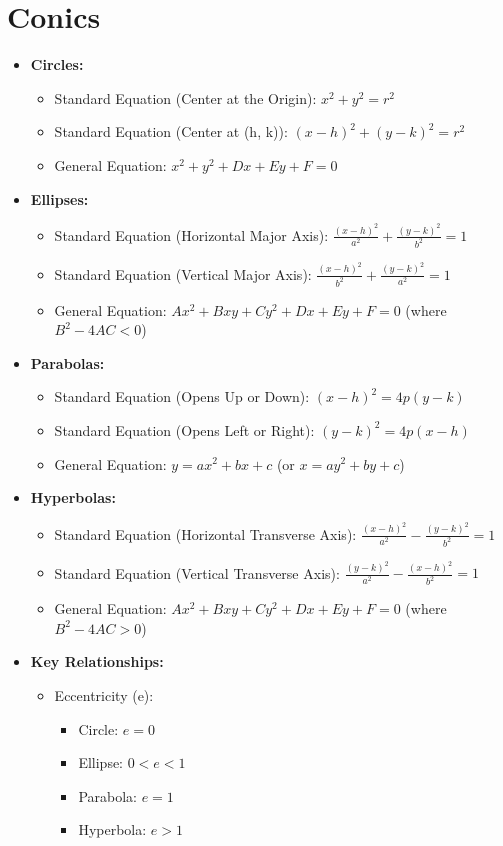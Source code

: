 \documentclass[letterpaper,12pt]{article}
\author{Shawn Ma}
\date{\today}
\begin{document}
\setlength{\parindent}{0pt}
\section{Conics}
\begin{itemize}
    \item \textbf{Circles:}
        \begin{itemize}
        \item Standard Equation (Center at the Origin):  $x^2 + y^2 = r^2$
        \item Standard Equation (Center at (h, k)): $(x - h)^2 + (y - k)^2 = r^2$
        \item General Equation: $x^2 + y^2 + Dx + Ey + F = 0$
        \end{itemize}
    \item \textbf{Ellipses:}
        \begin{itemize}
        \item Standard Equation (Horizontal Major Axis): $\frac{(x - h)^2}{a^2} + \frac{(y - k)^2}{b^2} = 1$
        \item Standard Equation (Vertical Major Axis): $\frac{(x - h)^2}{b^2} + \frac{(y - k)^2}{a^2} = 1$
        \item General Equation: $Ax^2 + Bxy + Cy^2 + Dx + Ey + F = 0$ (where $B^2 - 4AC < 0$)
        \end{itemize}
    \item \textbf{Parabolas:}
        \begin{itemize}
        \item Standard Equation (Opens Up or Down): $(x - h)^2 = 4p(y - k)$
        \item Standard Equation (Opens Left or Right): $(y - k)^2 = 4p(x - h)$
        \item General Equation: $y = ax^2 + bx + c$ (or $x = ay^2 + by + c$)
        \end{itemize}
    \item \textbf{Hyperbolas:}
        \begin{itemize}
        \item Standard Equation (Horizontal Transverse Axis): $\frac{(x - h)^2}{a^2} - \frac{(y - k)^2}{b^2} = 1$
        \item Standard Equation (Vertical Transverse Axis): $\frac{(y - k)^2}{a^2} - \frac{(x - h)^2}{b^2} = 1$
        \item General Equation: $Ax^2 + Bxy + Cy^2 + Dx + Ey + F = 0$ (where $B^2 - 4AC > 0$)
        \end{itemize}
    \item \textbf{Key Relationships:}
        \begin{itemize}
        \item Eccentricity (e):
            \begin{itemize}
            \item Circle: $e = 0$
            \item Ellipse: $0 < e < 1$
            \item Parabola: $e = 1$
            \item Hyperbola: $e > 1$
            \end{itemize}
        \end{itemize}
    \end{itemize}
\end{document}
